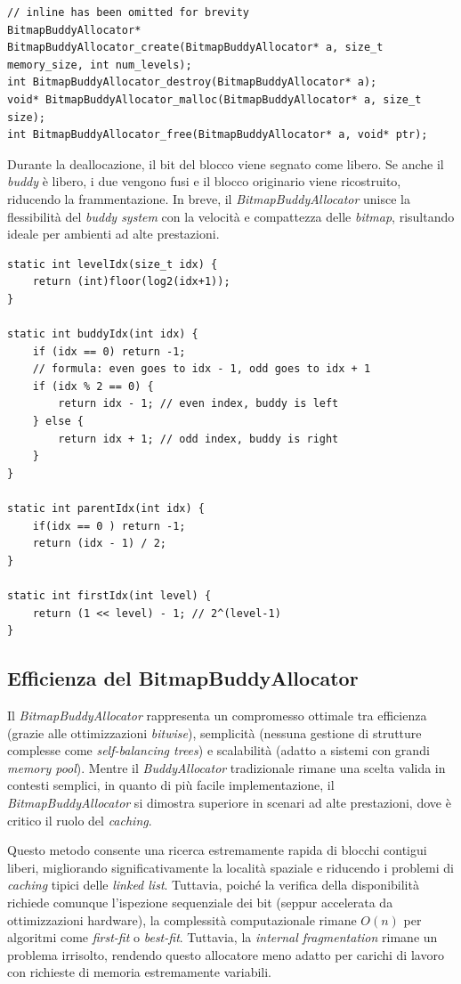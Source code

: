 \begin{lstlisting}
// inline has been omitted for brevity
BitmapBuddyAllocator* BitmapBuddyAllocator_create(BitmapBuddyAllocator* a, size_t memory_size, int num_levels);
int BitmapBuddyAllocator_destroy(BitmapBuddyAllocator* a);
void* BitmapBuddyAllocator_malloc(BitmapBuddyAllocator* a, size_t size);
int BitmapBuddyAllocator_free(BitmapBuddyAllocator* a, void* ptr);
\end{lstlisting}

Durante la deallocazione, il bit del blocco viene segnato come libero. Se anche il \textit{buddy} è libero, i due vengono fusi e il blocco originario viene ricostruito, riducendo la frammentazione. In breve, il \textit{BitmapBuddyAllocator} unisce la flessibilità del \textit{buddy system} con la velocità e compattezza delle \textit{bitmap}, risultando ideale per ambienti ad alte prestazioni.

\begin{lstlisting}
static int levelIdx(size_t idx) {
    return (int)floor(log2(idx+1));
}

static int buddyIdx(int idx) {
    if (idx == 0) return -1;
    // formula: even goes to idx - 1, odd goes to idx + 1
    if (idx % 2 == 0) {
        return idx - 1; // even index, buddy is left
    } else {
        return idx + 1; // odd index, buddy is right
    }
}

static int parentIdx(int idx) {
    if(idx == 0 ) return -1;
    return (idx - 1) / 2;
}

static int firstIdx(int level) {
    return (1 << level) - 1; // 2^(level-1)
}
\end{lstlisting}

\subsection*{Efficienza del BitmapBuddyAllocator}
Il \textit{BitmapBuddyAllocator} rappresenta un compromesso ottimale tra efficienza (grazie alle ottimizzazioni \textit{bitwise}), semplicità (nessuna gestione di strutture complesse come \textit{self-balancing trees}) e scalabilità (adatto a sistemi con grandi \textit{memory pool}). Mentre il \textit{BuddyAllocator} tradizionale rimane una scelta valida in contesti semplici, in quanto di più facile implementazione, il \textit{BitmapBuddyAllocator} si dimostra superiore in scenari ad alte prestazioni, dove è critico il ruolo del \textit{caching}. 

Questo metodo consente una ricerca estremamente rapida di blocchi contigui liberi, migliorando significativamente la località spaziale e riducendo i problemi di \textit{caching} tipici delle \textit{linked list}. Tuttavia, poiché la verifica della disponibilità richiede comunque l’ispezione sequenziale dei bit (seppur accelerata da ottimizzazioni hardware), la complessità computazionale rimane $O(n)$ per algoritmi come \textit{first-fit} o \textit{best-fit}. Tuttavia, la \textit{internal fragmentation} rimane un problema irrisolto, rendendo questo allocatore meno adatto per carichi di lavoro con richieste di memoria estremamente variabili.

